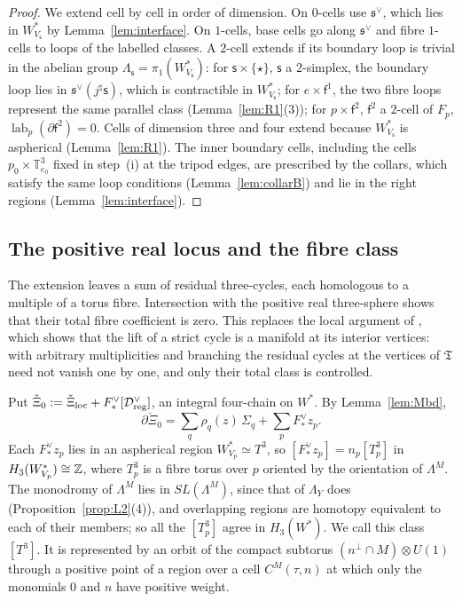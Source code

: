 \begin{proof}
We extend cell by cell in order of dimension. On $0$-cells use $\mathfrak s^\vee$, which lies in $W^*_{V_{\mathsf s}}$ by
Lemma~\ref{lem:interface}. On $1$-cells, base cells go along $\mathfrak s^\vee$ and fibre $1$-cells to loops of the labelled
classes. A $2$-cell extends if its boundary loop is trivial in the abelian group $\Lambda_{\mathsf s}=\pi_1(W^*_{V_{\mathsf s}})$: for $\mathsf s\times\{\star\}$,
$\mathsf s$ a $2$-simplex, the boundary loop lies in $\mathfrak s^\vee(j^\natural \mathsf s)$, which is contractible in $W^*_{V_{\mathsf s}}$; for
$e\times\mathsf f^1$, the two fibre loops represent the same parallel class (Lemma~\ref{lem:R1}(3)); for $p\times\mathsf f^2$,
$\mathsf f^2$ a $2$-cell of $F_p$, $\operatorname{lab}_p(\partial\mathsf f^2)=0$. Cells of dimension three and four extend because $W^*_{V_{\mathsf s}}$ is
aspherical (Lemma~\ref{lem:R1}). The inner boundary cells, including the cells $p_0\times\mathbb T^3_{e_0}$ fixed in step~(i) at the
tripod edges, are prescribed by the collars, which satisfy the same loop conditions
(Lemma~\ref{lem:collarB}) and lie in the right regions (Lemma~\ref{lem:interface}).
\end{proof}

\subsection{The positive real locus and the fibre class}\label{ssec:lift-fibre}
The extension leaves a sum of residual three-cycles, each homologous to a multiple of a torus fibre.
Intersection with the positive real three-sphere shows that their total fibre coefficient is zero. This replaces the local
argument of \cite[\S7.7, Step~5]{CBM}, which shows that the lift of a strict cycle is a manifold at its interior vertices:
with arbitrary multiplicities and branching the residual cycles at the vertices of $\mathfrak T$ need not vanish one by
one, and only their total class is controlled.

Put $\check\Xi_0:=\check\Xi_{\rm loc}+F^\vee_*[\mathcal D^\vee_{\rm reg}]$, an integral four-chain on $W^*$. By
Lemma~\ref{lem:Mbd},
\[
\partial\check\Xi_0=\sum_q\rho_q(z)\,\Sigma_q+\sum_pF^\vee_*z_p .
\]
Each $F^\vee_*z_p$ lies in an aspherical region $W^*_{V_p}\simeq T^3$, so $[F^\vee_*z_p]=n_p[T^3_p]$ in
$H_3(W^*_{V_p})\cong\mathbb Z$, where $T^3_p$ is a fibre torus over $p$ oriented by the orientation of $\Lambda^M$. The monodromy of
$\Lambda^M$ lies in $SL(\Lambda^M)$, since that of $\Lambda_Y$ does (Proposition~\ref{prop:L2}(4)), and overlapping regions are
homotopy equivalent to each of their members; so all the $[T^3_p]$ agree in $H_3(W^*)$. We call this class $[T^3]$. It is
represented by an orbit of the compact subtorus $(n^\perp\cap M)\otimes U(1)$ through a positive point of a region over a
cell $C^M(\tau,n)$ at which only the monomials $0$ and $n$ have positive weight.

